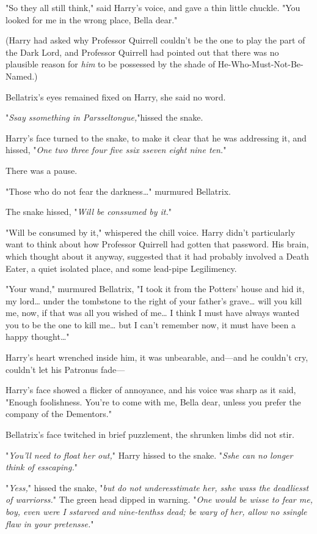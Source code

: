 "So they all still think," said Harry's voice, and gave a thin little chuckle. 
"You looked for me in the wrong place, Bella dear."

(Harry had asked why Professor Quirrell couldn't be the one to play the part of 
the Dark Lord, and Professor Quirrell had pointed out that there was no 
plausible reason for \emph{him} to be possessed by the shade of 
He-Who-Must-Not-Be-Named.)

Bellatrix's eyes remained fixed on Harry, she said no word.

"\emph{Ssay ssomething in Parsseltongue,}"hissed the snake.

Harry's face turned to the snake, to make it clear that he was addressing it, 
and hissed, "\emph{One two three four five ssix sseven eight nine ten.}"

There was a pause.

"Those who do not fear the darkness{\ldots}" murmured Bellatrix.

The snake hissed, "\emph{Will be conssumed by it.}"

"Will be consumed by it," whispered the chill voice. Harry didn't particularly 
want to think about how Professor Quirrell had gotten that password. His brain, 
which thought about it anyway, suggested that it had probably involved a Death 
Eater, a quiet isolated place, and some lead-pipe Legilimency.

"Your wand," murmured Bellatrix, "I took it from the Potters' house and hid it, 
my lord{\ldots} under the tombstone to the right of your father's grave{\ldots} 
will you kill me, now, if that was all you wished of me{\ldots} I think I must 
have always wanted you to be the one to kill me{\ldots} but I can't remember 
now, it must have been a happy thought{\ldots}"

Harry's heart wrenched inside him, it was unbearable, and---and he couldn't 
cry, couldn't let his Patronus fade---

Harry's face showed a flicker of annoyance, and his voice was sharp as it said, 
"Enough foolishness. You're to come with me, Bella dear, unless you prefer the 
company of the Dementors."

Bellatrix's face twitched in brief puzzlement, the shrunken limbs did not stir.

"\emph{You'll need to float her out,}" Harry hissed to the snake. "\emph{Sshe 
can no longer think of esscaping.}"

"\emph{Yess,}" hissed the snake, "\emph{but do not underesstimate her, sshe 
wass the deadliesst of warriorss.}" The green head dipped in warning. 
"\emph{One would be wisse to fear me, boy, even were I sstarved and 
nine-tenthss dead; be wary of her, allow no ssingle flaw in your pretensse.}"

